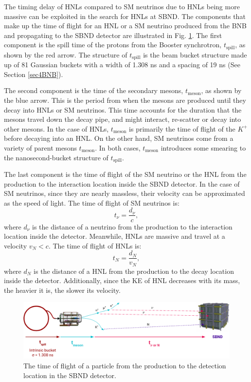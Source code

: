 The timing delay of HNLs compared to SM neutrinos due to HNLs being more massive can be exploited in the search for HNLs at SBND. 
The components that make up the time of flight for an HNL or a SM neutrino produced from the BNB and propagating to the SBND detector are illustrated in Fig. \ref{fig:tof_beam_to_detector}.
The first component is the spill time of the protons from the Booster synchrotron, $t_{\mathrm{spill}}$, as shown by the red arrow.
The structure of $t_{\mathrm{spill}}$ is the beam bucket structure made up of 81 Gaussian buckets with a width of 1.308 ns and a spacing of 19 ns (See Section \ref{sec4BNB}).

The second component is the time of the secondary mesons, $t_{\mathrm{meson}}$, as shown by the blue arrow.
This is the period from when the mesons are produced until they decay into HNLs or SM neutrinos.
This time accounts for the duration that the mesons travel down the decay pipe, and might interact, re-scatter or decay into other mesons.
In the case of HNLs, $t_{\mathrm{meson}}$ is primarily the time of flight of the $K^+$ before decaying into an HNL.
On the other hand, SM neutrinos come from a variety of parent mesons $t_{\mathrm{meson}}$. %
In both cases, $t_{\mathrm{meson}}$ introduces some smearing to the nanosecond-bucket structure of $t_{\mathrm{spill}}$.

The last component is the time of flight of the SM neutrino or the HNL from the production to the interaction location inside the SBND detector.
In the case of SM neutrinos, since they are nearly massless, their velocity can be approximated as the speed of light. 
The time of flight of SM neutrinos is:  
\begin{equation}
	t_{\nu} = \frac{d_{\nu}}{c},
\end{equation}
where $d_{\nu}$ is the distance of a neutrino from the production to the interaction location inside the detector.
Meanwhile, HNLs are massive and travel at a velocity $v_N < c$.
The time of flight of HNLs is:
\begin{equation}
	t_{N} = \frac{d_{N}}{v_N},
\end{equation}
where $d_N$ is the distance of a HNL from the production to the decay location inside the detector.
Additionally, since the KE of HNL decreases with its mass, the heavier it is, the slower its velocity.

\begin{figure}[hb!] 
\vspace{0.5cm}
\centering    
\includegraphics[width=1.0\textwidth]{tof_beam_to_detector}
\caption[Time of Flight of Particles from the BNB to SBND Diagram]{
The time of flight of a particle from the production to the detection location in the SBND detector.
}
\label{fig:tof_beam_to_detector}
\end{figure}

